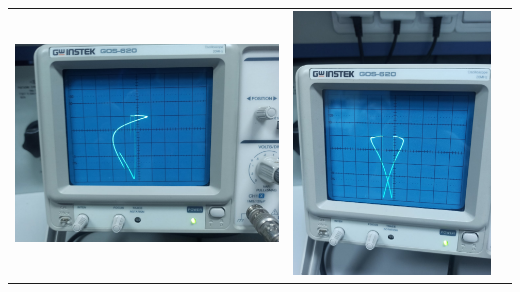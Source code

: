 \documentclass[a4paper, 12pt]{article}
\begin{document}
\begin{table}[!h]
    \begin{tabular}{ccc}
        \includegraphics[scale = 0.1]{0int} &
        \includegraphics[scale = 0.1]{1int} &

\end{tabular}
\end{table}
\end{document}

